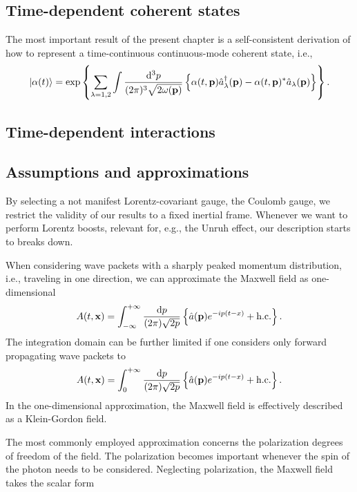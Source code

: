 
\subsection*{Time-dependent coherent states}

The most important result of the present chapter is a self-consistent derivation of how to represent a time-continuous continuous-mode coherent state, i.e.,
\begin{equation}
	\ket{\alpha(t)}
	=
	\exp\left\{
		\sum_{\lambda=1,2}
		\int\frac{\dd[3]{p}}{(2\pi)^3\sqrt{2\omega(\vb{p})}}
		\left\{
			\alpha(t,\vb{p})
			\hat{a}_\lambda^\dagger(\vb{p})
			-
			\alpha(t,\vb{p})^*
			\hat{a}_\lambda(\vb{p})
		\right\}
	\right\}
	.
\end{equation}

\subsection*{Time-dependent interactions}

\subsection*{Assumptions and approximations}

By selecting a not manifest Lorentz-covariant gauge, the Coulomb gauge, we restrict the validity of our results to a fixed inertial frame.
Whenever we want to perform Lorentz boosts, relevant for, e.g., the Unruh effect, our description starts to breaks down.

When considering wave packets with a sharply peaked momentum distribution, i.e., traveling in one direction, we can approximate the Maxwell field as one-dimensional
\begin{equation}
	A(t,\vb{x})
	=
	\int_{-\infty}^{+\infty}
	\frac{\dd{p}}{(2\pi)\sqrt{2p}}
	\left\{
		\hat{a}(\vb{p})
		e^{-ip(t-x)}
		+
		\text{h.c.}
	\right\}
	.
\end{equation}
The integration domain can be further limited if one considers only forward propagating wave packets to
\begin{equation}
	A(t,\vb{x})
	=
	\int_0^{+\infty}
	\frac{\dd{p}}{(2\pi)\sqrt{2p}}
	\left\{
		\hat{a}(\vb{p})
		e^{-ip(t-x)}
		+
		\text{h.c.}
	\right\}
	.
\end{equation}
In the one-dimensional approximation, the Maxwell field is effectively described as a Klein-Gordon field.

The most commonly employed approximation concerns the polarization degrees of freedom of the field.
The polarization becomes important whenever the spin of the photon needs to be considered.
Neglecting polarization, the Maxwell field takes the scalar form

